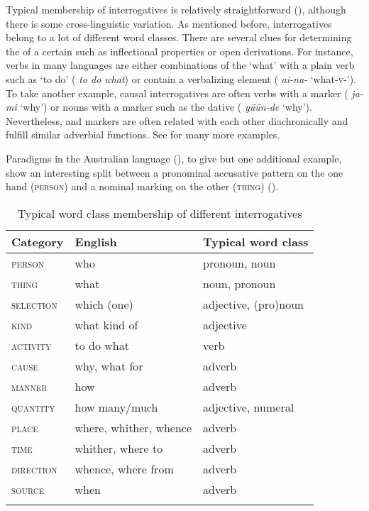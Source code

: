 Typical  membership of interrogatives is relatively straightforward (), although there is some cross-linguistic variation. As mentioned before, interrogatives belong to a lot of different word classes. There are several clues for determining the  of a certain  such as inflectional properties or open derivations. For instance,  verbs in many languages are either combinations of the  ‘what’ with a plain verb such as ‘to do’ ( \textit{to do what}) or contain a verbalizing element ( \textit{ai-na-} ‘what-\textsc{v}-’). To take another example, causal interrogatives are often verbs with a  marker ( \textit{ja-mi} ‘why’) or nouns with a  marker such as the dative ( \textit{yüün-de} ‘why’). Nevertheless,  and  markers are often related with each other diachronically and fulfill similar adverbial functions. See  for many more examples.

Paradigms in the Australian language  (), to give but one additional example, show an interesting split between a pronominal accusative pattern on the one hand (\textsc{person}) and a nominal  marking on the other (\textsc{thing}) ().

\begin{table}
\caption{Typical word class membership of different interrogatives}
\label{tab:4:9}

\begin{tabularx}{\textwidth}{QQl}
\lsptoprule

\textbf{Category} & \textbf{English} & \textbf{Typical word class}\\
\midrule
\textsc{person} & who & pronoun, noun\\
\textsc{thing} & what & noun, pronoun\\
\textsc{selection} & which (one) & adjective, (pro)noun\\
\textsc{kind} & what kind of & adjective\\
\textsc{activity} & to do what & verb\\
\textsc{cause} & why, what for & adverb\\
\textsc{manner} & how & adverb\\
\textsc{quantity} & how many/much & adjective, numeral\\
\textsc{place} & where, whither, whence & adverb\\
\textsc{time} & whither, where to & adverb\\
\textsc{direction}  & whence, where from & adverb\\
\textsc{source} & when & adverb\\
\lspbottomrule
\end{tabularx}
\end{table}

